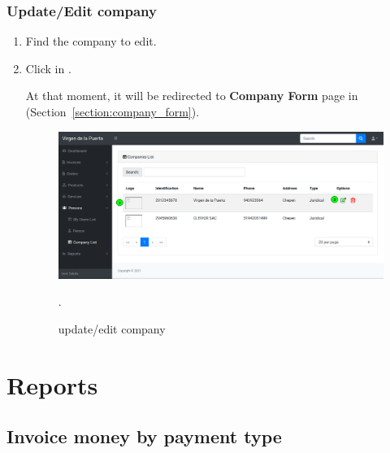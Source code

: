 \documentclass[a4paper,11pt]{refart}
\begin{document}
\subsubsection{Update/Edit company}
\begin{enumerate}
	\item Find the company to edit.
	\item Click in .
	\medskip
	\begin{leftbar}
		At that moment, it will be redirected to \textbf{Company Form} page in (Section~\ref{section:company_form}).
	\end{leftbar}
	\begin{figure}[H]\centering
		\includegraphics[width=\textwidth]{images/company_list-update.png}
		\caption{update/edit company}
		\label{fig:company_list-update}.
	\end{figure}
\end{enumerate}

\section{Reports}
\subsection{Invoice money by payment type}\label{section:invoice_money_by_payment_type}
\end{document}
